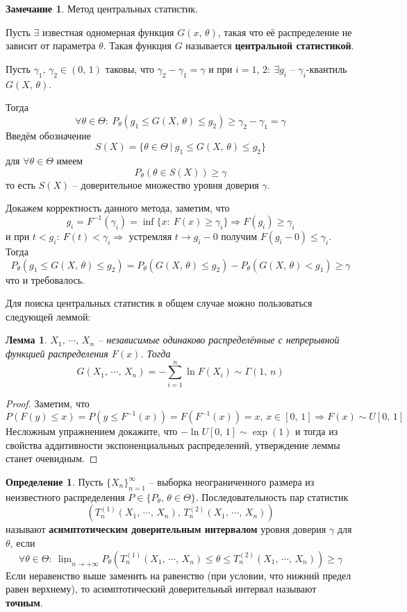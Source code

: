 \documentclass[a4paper,12pt]{article}
\renewcommand{\leq}{\ensuremath{\leqslant}}
\renewcommand{\geq}{\ensuremath{\geqslant}}
\theoremstyle{plain}
\newtheorem{lemma}{Лемма}[section]
\theoremstyle{definition}
\newtheorem{definition}{Определение}[section]
\newtheorem*{note}{Замечание}
\theoremstyle{remark}
\begin{document}
\begin{note}
  Метод центральных статистик.

  Пусть $\exists$ известная одномерная функция $G(x,\, \theta)$, такая что её распределение не зависит от параметра $\theta$. Такая функция $G$ называется \textbf{центральной статистикой}.

  Пусть $\gamma_1,\,\gamma_2 \in (0,\,1)$ таковы, что $\gamma_2 - \gamma_1 = \gamma$ и при $i = 1,\,2 :\: \exists g_i$ -- $\gamma_i$-квантиль $G(X,\, \theta)$.
  
  Тогда
  \[
    \forall \theta \in \Theta :\: P_\theta(g_1 \leq G(X,\, \theta) \leq g_2) \geq \gamma_2 - \gamma_1 = \gamma
  \]
  Введём обозначение
  \[
    S(X) = \{\theta \in \Theta \:\vert\: g_1 \leq G(X,\,\theta) \leq g_2\}
  \]
  для $\forall \theta \in \Theta$ имеем
  \[
    P_\theta(\theta \in S(X)) \geq \gamma
  \]
  то есть $S(X)$ -- доверительное множество уровня доверия $\gamma$.

  Докажем корректность данного метода, заметим, что
  \[
    g_i = F^{-1}(\gamma_i) = \inf\{x :\: F(x) \geq \gamma_i\} \Rightarrow F(g_i) \geq \gamma_i
  \]
  и при $t < g_i :\: F(t) < \gamma_i \Rightarrow$ устремляя $t \to g_i - 0$ получим $F(g_i - 0) \leq \gamma_i$. Тогда
  \[
    P_\theta(g_1 \leq G(X,\, \theta) \leq g_2) = P_\theta(G(X,\,\theta) \leq g_2) - P_\theta(G(X,\,\theta) < g_1) \geq \gamma
  \]
  что и требовалось.
\end{note}

Для поиска центральных статистик в общем случае можно пользоваться следующей леммой:
\begin{lemma}
  $X_1,\,\cdots,\,X_n$ -- независимые одинаково распределённые с непрерывной функцией распределения $F(x)$. Тогда
  \[
    G(X_1,\,\cdots,\,X_n) = -\sum_{i = 1}^n\ln F(X_i) \sim \Gamma(1,\,n)
  \]
\end{lemma}

\begin{proof}
  Заметим, что
  \[
    P(F(y) \leq x) = P(y \leq F^{-1}(x)) = F(F^{-1}(x)) = x,\, x \in [0,\, 1] \Rightarrow F(x) \sim U[0,\,1]
  \]
  Несложным упражнением докажите, что $-\ln U[0,\,1] \sim \exp(1)$ и тогда из свойства аддитивности экспоненциальных распределений, утверждение леммы станет очевидным.
\end{proof}

\begin{definition}
  Пусть $\{X_n\}_{n = 1}^\infty$ -- выборка неограниченного размера из неизвестного распределения $P \in \{P_\theta,\, \theta \in \Theta\}$. Последовательность пар статистик 
  \[
    (T_n^{(1)}(X_1,\,\cdots,\,X_n),\, T_n^{(2)}(X_1,\,\cdots,\,X_n))
  \]
  называют \textbf{асимптотическим доверительным интервалом} уровня доверия $\gamma$ для $\theta$, если
  \[
    \forall \theta \in \Theta :\: \underline{\lim}_{n \to +\infty} P_\theta(T_n^{(1)}(X_1,\,\cdots,\,X_n) \leq \theta \leq T_n^{(2)}(X_1,\,\cdots,\,X_n)) \geq \gamma
  \]
  Если неравенство выше заменить на равенство (при условии, что нижний предел равен верхнему), то асимптотический доверительный интервал называют \textbf{точным}.
\end{definition}
\end{document}
